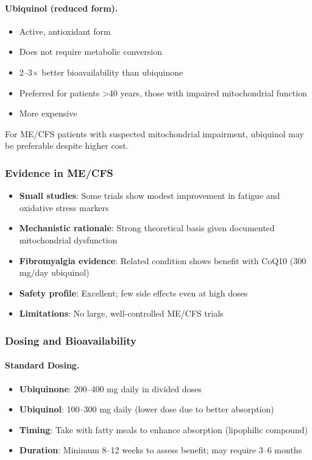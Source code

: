 \paragraph{Ubiquinol (reduced form).}
\begin{itemize}
    \item Active, antioxidant form
    \item Does not require metabolic conversion
    \item 2--3$\times$ better bioavailability than ubiquinone
    \item Preferred for patients >40 years, those with impaired mitochondrial function
    \item More expensive
\end{itemize}

For ME/CFS patients with suspected mitochondrial impairment, ubiquinol may be preferable despite higher cost.

\subsubsection{Evidence in ME/CFS}

\begin{itemize}
    \item \textbf{Small studies}: Some trials show modest improvement in fatigue and oxidative stress markers
    \item \textbf{Mechanistic rationale}: Strong theoretical basis given documented mitochondrial dysfunction
    \item \textbf{Fibromyalgia evidence}: Related condition shows benefit with CoQ10 (300 mg/day ubiquinol)
    \item \textbf{Safety profile}: Excellent; few side effects even at high doses
    \item \textbf{Limitations}: No large, well-controlled ME/CFS trials
\end{itemize}

\subsubsection{Dosing and Bioavailability}

\paragraph{Standard Dosing.}
\begin{itemize}
    \item \textbf{Ubiquinone}: 200--400 mg daily in divided doses
    \item \textbf{Ubiquinol}: 100--300 mg daily (lower dose due to better absorption)
    \item \textbf{Timing}: Take with fatty meals to enhance absorption (lipophilic compound)
    \item \textbf{Duration}: Minimum 8--12 weeks to assess benefit; may require 3--6 months
\end{itemize}

